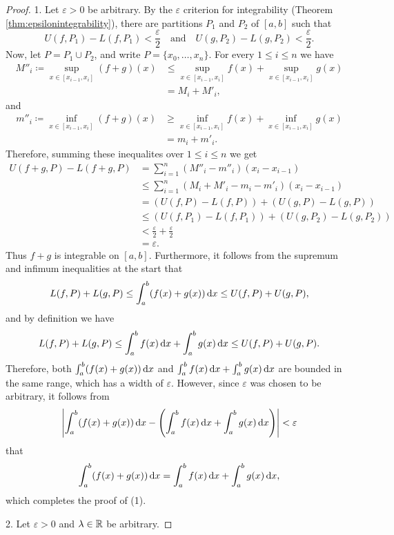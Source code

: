 \documentclass[../analysis1.tex]{subfiles}
\begin{document}
\begin{proof}
    1. Let $\varepsilon>0$ be arbitrary. By the $\varepsilon$ criterion for integrability (Theorem \ref{thm:epsilonintegrability}), there are partitions $P_1$ and $P_2$ of $[a,b]$ such that 
    \[U(f,P_1)-L(f,P_1)<\frac{\varepsilon}{2}\quad\text{and}\quad U(g,P_2)-L(g,P_2)<\frac{\varepsilon}{2}.\]
    Now, let $P=P_1\cup P_2$, and write $P=\{x_0,\dots,x_n\}$. For every $1\le i\le n$ we have
    \begin{align*}
    M''_i\coloneqq \sup_{x\in[x_{i-1},x_i]}(f+g)(x)&\le \sup_{x\in[x_{i-1},x_i]}f(x)+\sup_{x\in[x_{i-1},x_i]}g(x)\\
    &= M_i+M'_i,
    \end{align*}
    and
    \begin{align*}
        m''_i\coloneqq \inf_{x\in[x_{i-1},x_i]}(f+g)(x)&\ge \inf_{x\in[x_{i-1},x_i]}f(x)+\inf_{x\in[x_{i-1},x_i]}g(x)\\
        &= m_i+m'_i.
    \end{align*}
    Therefore, summing these inequalites over $1\le i\le n$ we get
    \begin{align*}
    U(f+g,P)-L(f+g,P)&=\sum_{i=1}^n(M''_i-m''_i)(x_i-x_{i - 1})\\
    &\le \sum_{i=1}^n(M_i+M'_i-m_i-m'_i)(x_i-x_{i - 1})\\
    &= \left(U(f,P)-L(f,P)\right)+\left(U(g,P)-L(g,P)\right)\\
    &\le \left(U(f,P_1)-L(f,P_1)\right)+\left(U(g,P_2)-L(g,P_2)\right)\\
    &< \frac{\varepsilon}{2}+\frac{\varepsilon}{2}\\
    &=\varepsilon.
    \end{align*}
    Thus $f+g$ is integrable on $[a,b]$. Furthermore, it follows from the supremum and infimum inequalities at the start that
    \[L(f,P)+L(g,P)\le \int_a^b(f(x)+g(x))\d{x}\le U(f,P)+U(g,P),\]
    and by definition we have
    \[L(f,P)+L(g,P)\le \int_a^b f(x)\d{x}+\int_a^b g(x)\d{x}\le U(f,P)+U(g,P).\]
    Therefore, both $\int_a^b(f(x)+g(x))\d{x}$ and $\int_a^b f(x)\d{x}+\int_a^b g(x)\d{x}$ are bounded in the same range, which has a width of $\varepsilon$. However, since $\varepsilon$ was chosen to be arbitrary, it follows from
    \[\left|\int_a^b(f(x)+g(x))\d{x}-\left(\int_a^b f(x)\d{x}+\int_a^b g(x)\d{x}\right)\right|<\varepsilon\]
    that \[\int_a^b(f(x)+g(x))\d{x}=\int_a^bf(x)\d{x}+\int_a^b g(x)\d{x},\]
    which completes the proof of (1).\hfill \qedsymbol

    2. Let $\varepsilon>0$ and $\lambda\in\mathbb{R}$ be arbitrary.


\end{proof}
\end{document}
